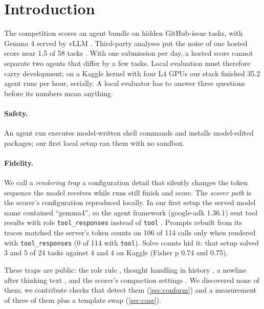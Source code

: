\section{Introduction}\label{sec:intro}

The competition scores an agent bundle on hidden GitHub-issue tasks, with Gemma 4 served by vLLM \citep{kwon2023vllm}.
Third-party analyses put the noise of one hosted score near 1.5 of 58 tasks \citep{afshar2026census,mobassir2026toosmall}.
With one submission per day, a hosted score cannot separate two agents that differ by a few tasks. Local evaluation must
therefore carry development; on a Kaggle kernel with four L4 GPUs our stack finished 35.2 agent runs per hour, serially.
A local evaluator has to answer three questions before its numbers mean anything.

\paragraph{Safety.} An agent run executes model-written shell commands and installs model-edited packages; our first
local setup ran them with no sandbox.

\paragraph{Fidelity.} We call a \emph{rendering trap} a configuration detail that silently changes the token sequence
the model receives while runs still finish and score. The \emph{scorer path} is the scorer's configuration reproduced
locally. In our first setup the served model name contained ``gemma4'', so the agent framework (google-adk 1.36.1) sent
tool results with role \texttt{tool\_responses} instead of \texttt{tool} \citep{adk2026toolresponses}. Prompts rebuilt
from its traces matched the server's token counts on 106 of 114 calls only when rendered with \texttt{tool\_responses}
(0 of 114 with \texttt{tool}). Solve counts hid it: that setup solved 3 and 5 of 24 tasks against 4 and 4 on Kaggle
(Fisher p 0.74 and 0.75).

These traps are public: the role rule \citep{adk2026toolresponses}, thought handling in history
\citep{google2026gemma4prompt,dimondev2026hf44,delta90002026vllm38488}, a newline after thinking text
\citep{gerganov2026hf135}, and the scorer's compaction settings \citep{holbrook2026starter}. We discovered none of them;
we contribute checks that detect them (\cref{sec:conform}) and a measurement of three of them plus a template swap
(\cref{sec:case}).

